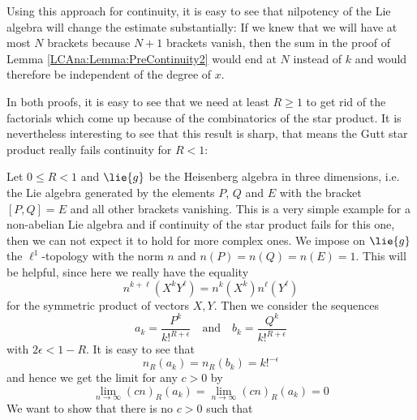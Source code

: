 Using this approach for continuity, it is easy to see that nilpotency
of the Lie algebra will change the estimate substantially: If we knew that
we will have at most $N$ brackets because $N + 1$ brackets vanish,
then the sum in the proof of Lemma \ref{LCAna:Lemma:PreContinuity2}
would end at $N$ instead of $k$ and would therefore be independent of
the degree of $x$.


In both proofs, it is easy to see that we need at least $R \geq 1$ to
get rid of the factorials which come up because of the combinatorics
of the star product. It is nevertheless interesting to see that this
result is sharp, that means the Gutt star product really fails
continuity for $R < 1$:
\begin{example}
    \label{LCAna:Ex:HeisenbergAlgebra}%
    Let $0 \leq R < 1$ and $\lie{g}$ be the Heisenberg algebra in three 
    dimensions, i.e. the Lie algebra generated by the elements 
    $P$, $Q$ and $E$ with the bracket $[P,Q] = E$ and all other brackets
    vanishing. This is a very simple example for a non-abelian Lie algebra
    and if continuity of the star product fails for this one, then we
    can not expect it to hold for more complex ones. We impose on
    $\lie{g}$ the $\ell^1$-topology with the norm $n$ and $n(P) = n(Q)
    = n(E) = 1$. This will be helpful, since here we really have the equality
    \begin{equation*}
    		n^{k + \ell} \left( X^k Y^\ell \right)
    		=
    		n^k \left( X^k \right)
    		n^\ell \left( Y^\ell \right)
    \end{equation*}
    for the symmetric product of vectors $X, Y$. Then we consider 
    the sequences
    \begin{equation*}
        a_k
        =
        \frac{P^k}{k!^{R + \epsilon}}
        \quad
        \textrm{and}
        \quad
        b_k
        =
        \frac{Q^k}{k!^{R + \epsilon}}
    \end{equation*}
    with $2 \epsilon < 1 - R$. It is easy to see that
    \begin{equation*}
        n_R(a_k)
        =
        n_R(b_k)
        =
        k!^{- \epsilon}
    \end{equation*}
    and hence we get the limit for any $c > 0$ by
    \begin{equation*}
     	\lim_{n \longrightarrow \infty}
     	(cn)_R(a_k)
     	=
     	\lim_{n \longrightarrow \infty}
     	(cn)_R(a_k)
     	=
     	0
    \end{equation*}
    We want to show that there is no $c > 0$ such that

\end{example}

